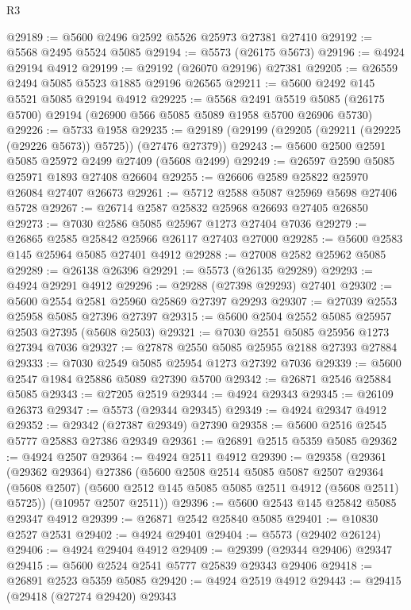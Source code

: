\begin{lexlean}{R3}
\begin{coremodule}
@29189 := @5600 @2496 @2592 @5526 @25973 @27381 @27410
@29192 := @5568 @2495 @5524 @5085
@29194 := @5573 (@26175 @5673)
@29196 := @4924 @29194 @4912
@29199 := @29192 (@26070 @29196) @27381
@29205 := @26559 @2494 @5085 @5523 @1885 @29196 @26565
@29211 := @5600 @2492 @145 @5521 @5085 @29194 @4912
@29225 := @5568
    @2491
    @5519
    @5085
    (@26175 @5700)
    @29194
    (@26900 @566 @5085 @5089 @1958 @5700 @26906 @5730)
@29226 := @5733 @1958
@29235 := @29189 (@29199 (@29205 (@29211 (@29225 (@29226 @5673)) @5725)) (@27476 @27379))
@29243 := @5600 @2500 @2591 @5085 @25972 @2499 @27409 (@5608 @2499)
@29249 := @26597 @2590 @5085 @25971 @1893 @27408 @26604
@29255 := @26606 @2589 @25822 @25970 @26084 @27407 @26673
@29261 := @5712 @2588 @5087 @25969 @5698 @27406 @5728
@29267 := @26714 @2587 @25832 @25968 @26693 @27405 @26850
@29273 := @7030 @2586 @5085 @25967 @1273 @27404 @7036
@29279 := @26865 @2585 @25842 @25966 @26117 @27403 @27000
@29285 := @5600 @2583 @145 @25964 @5085 @27401 @4912
@29288 := @27008 @2582 @25962 @5085
@29289 := @26138 @26396
@29291 := @5573 (@26135 @29289)
@29293 := @4924 @29291 @4912
@29296 := @29288 (@27398 @29293) @27401
@29302 := @5600 @2554 @2581 @25960 @25869 @27397 @29293
@29307 := @27039 @2553 @25958 @5085 @27396 @27397
@29315 := @5600 @2504 @2552 @5085 @25957 @2503 @27395 (@5608 @2503)
@29321 := @7030 @2551 @5085 @25956 @1273 @27394 @7036
@29327 := @27878 @2550 @5085 @25955 @2188 @27393 @27884
@29333 := @7030 @2549 @5085 @25954 @1273 @27392 @7036
@29339 := @5600 @2547 @1984 @25886 @5089 @27390 @5700
@29342 := @26871 @2546 @25884 @5085
@29343 := @27205 @2519
@29344 := @4924 @29343
@29345 := @26109 @26373
@29347 := @5573 (@29344 @29345)
@29349 := @4924 @29347 @4912
@29352 := @29342 (@27387 @29349) @27390
@29358 := @5600 @2516 @2545 @5777 @25883 @27386 @29349
@29361 := @26891 @2515 @5359 @5085
@29362 := @4924 @2507
@29364 := @4924 @2511 @4912
@29390 := @29358
    (@29361
      (@29362 @29364)
      @27386
      (@5600
        @2508
        @2514
        @5085
        @5087
        @2507
        @29364
        (@5608 @2507)
        (@5600 @2512 @145 @5085 @5085 @2511 @4912 (@5608 @2511) @5725))
      (@10957 @2507 @2511))
@29396 := @5600 @2543 @145 @25842 @5085 @29347 @4912
@29399 := @26871 @2542 @25840 @5085
@29401 := @10830 @2527 @2531
@29402 := @4924 @29401
@29404 := @5573 (@29402 @26124)
@29406 := @4924 @29404 @4912
@29409 := @29399 (@29344 @29406) @29347
@29415 := @5600 @2524 @2541 @5777 @25839 @29343 @29406
@29418 := @26891 @2523 @5359 @5085
@29420 := @4924 @2519 @4912
@29443 := @29415
    (@29418
      (@27274 @29420)
      @29343

\end{coremodule}
\end{lexlean}
